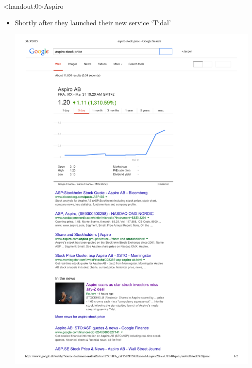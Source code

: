 \documentclass[english,10pt
,aspectratio=169
]{beamer}
\begin{document}
\begin{frame}<handout:0>{Aspiro}
	\begin{itemize}
		\item Shortly after they launched their new service `Tidal'
		\pause
		\begin{center}
			\includegraphics[width=0.5\paperwidth]{pics/aspiro}
		\end{center}
	\end{itemize}
\end{frame}
\end{document}
